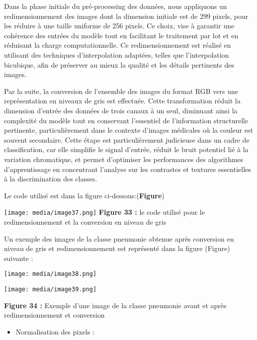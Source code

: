 \begin{quote}
\end{quote}

Dans la phase initiale du pré-processing des données, nous appliquons un
redimensionnement des images dont la dimension initiale est de 299
pixels, pour les réduire à une taille uniforme de 256 pixels. Ce choix,
vise à garantir une cohérence des entrées du modèle tout en facilitant
le traitement par lot et en réduisant la charge computationnelle. Ce
redimensionnement est réalisé en utilisant des techniques
d'interpolation adaptées, telles que l'interpolation bicubique, afin de
préserver au mieux la qualité et les détails pertinents des images.

Par la suite, la conversion de l'ensemble des images du format RGB vers
une représentation en niveaux de gris est effectuée. Cette
transformation réduit la dimension d'entrée des données de trois canaux
à un seul, diminuant ainsi la complexité du modèle tout en conservant
l'essentiel de l'information structurelle pertinente, particulièrement
dans le contexte d'images médicales où la couleur est souvent
secondaire. Cette étape est particulièrement judicieuse dans un cadre de
classification, car elle simplifie le signal d'entrée, réduit le bruit
potentiel lié à la variation chromatique, et permet d'optimiser les
performances des algorithmes d'apprentissage en concentrant l'analyse
sur les contrastes et textures essentielles à la discrimination des
classes.

Le code utilisé est dans la figure ci-dessous:(\textbf{Figure})

\texttt{[image: media/image37.png]}
\textbf{ Figure 33 :} le code utilisé pour le redimensionnement et la
conversion en niveau de gris

Un exemple des images de la classe pneumonie obtenue après conversion en
niveau de gris et redimensionnement est représenté dans la figure
(Figure) suivante :

\texttt{[image: media/image38.png]}

\texttt{[image: media/image39.png]}

\textbf{Figure 34 :} Exemple d'une image de la classe pneumonie avant et
après redimensionnement et conversion

\begin{itemize}
\tightlist
\item
  \protect{}\label{anchor-52}{}Normalisation des pixels :
\end{itemize}

